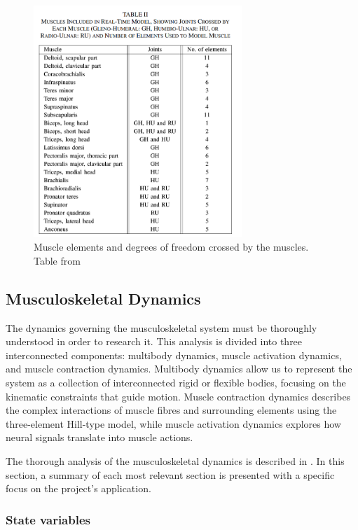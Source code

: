 \begin{figure}[ht!]
    \centering
    \includegraphics[width=0.7\textwidth]{Pictures/DAS/muscles_elements.png}
    \caption{Muscle elements and degrees of freedom crossed by the muscles. Table from \cite{RT3D}}
    \label{fig:muscle_elements}
\end{figure}

\newpage
\subsection{Musculoskeletal Dynamics}

The dynamics governing the musculoskeletal system must be thoroughly understood in order to research it. This analysis is divided into three interconnected components: multibody dynamics, muscle activation dynamics, and muscle contraction dynamics. Multibody dynamics allow us to represent the system as a collection of interconnected rigid or flexible bodies, focusing on the kinematic constraints that guide motion. Muscle contraction dynamics describes the complex interactions of muscle fibres and surrounding elements using the three-element Hill-type model, while muscle activation dynamics explores how neural signals translate into muscle actions.

The thorough analysis of the musculoskeletal dynamics is described in \cite{IMP}. In this section, a summary of each most relevant section is presented with a specific focus on the project's application.\newline


\subsubsection{State variables}\label{state}


